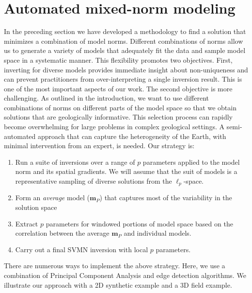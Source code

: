 \documentclass[extra,referee]{gji}
\begin{document}
\section{Automated mixed-norm modeling}
In the preceding section we have developed a methodology to find a solution that minimizes a combination of model norms. Different combinations of norms allow us to generate a variety of models that adequately fit the data and sample model space in a systematic manner.
This flexibility promotes two objectives.
First, inverting for diverse models provides immediate insight about non-uniqueness and can prevent practitioners from over-interpreting a single inversion result. This is one of the most important aspects of our work. The second objective is more challenging. As outlined in the introduction, we want to use different combinations of norms on different parts of the model space so that we obtain solutions that are geologically informative.
This selection process can rapidly become overwhelming for large problems in complex geological settings. A semi-automated approach that can capture the heterogeneity of the Earth, with minimal intervention from an expert, is needed. Our strategy is:
\begin{enumerate}
\item Run a suite of inversions over a range of $p$ parameters applied to the model norm and its spatial gradients. We will assume that the suit of models is a representative sampling of diverse solutions from the $\ell_p$-space.
\item Form an \emph{average} model ($\mathbf{m}_P$) that captures most of the variability in the solution space
\item Extract $p$ parameters for windowed portions of model space based on the correlation between the average $\mathbf{m}_P$ and individual models.
\item Carry out a final SVMN inversion with local $p$ parameters.
\end{enumerate}
There are numerous ways to implement the above strategy. Here, we use a combination of Principal Component Analysis and edge detection algorithms. We illustrate our approach with a 2D synthetic example and a 3D field example.
\end{document}
